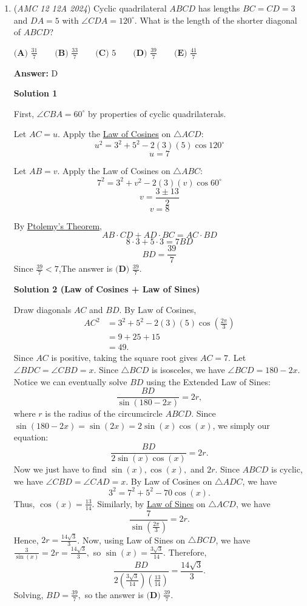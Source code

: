\begin{enumerate}
 


	\item (\textit{AMC 12 12A 2024}) Cyclic quadrilateral $ABCD$ has lengths $BC=CD=3$ and $DA=5$ with $\angle CDA=120^\circ$. What is the length of the shorter diagonal of $ABCD$?


 $\textbf{(A) }\frac{31}7 \qquad \textbf{(B) }\frac{33}7 \qquad \textbf{(C) }5 \qquad \textbf{(D) }\frac{39}7 \qquad \textbf{(E) }\frac{41}7 \qquad$

 \textbf{Answer: }D



\textbf{Solution 1}

First, $\angle CBA=60 ^\circ$ by properties of cyclic quadrilaterals.

 Let $AC=u$. Apply the \href{https://artofproblemsolving.com/wiki/index.php?title=Law\_of\_Cosines}{Law of Cosines} on $\triangle ACD$:
 \[u^2=3^2+5^2-2(3)(5)\cos120^\circ\]
 \[u=7\]

 Let $AB=v$. Apply the Law of Cosines on $\triangle ABC$:
 \[7^2=3^2+v^2-2(3)(v)\cos60^\circ\]
 \[v=\frac{3\pm13}{2}\]
 \[v=8\]

 By \href{https://artofproblemsolving.com/wiki/index.php?title=Ptolemy\%E2\%80\%99s\_Theorem}{Ptolemy’s Theorem},
 \[AB \cdot CD+AD \cdot BC=AC \cdot BD\]
 \[8 \cdot 3+5 \cdot 3=7BD\]
 \[BD=\frac{39}{7}\]Since $\frac{39}{7}<7$,The answer is $\boxed{\textbf{(D) }\frac{39}{7}}$.

 



\textbf{Solution 2 (Law of Cosines + Law of Sines)}

Draw diagonals $AC$ and $BD$. By Law of Cosines, \begin{align*}AC^2&=3^2 + 5^2 - 2(3)(5)\cos \left(\frac{2\pi}{3} \right) \\&= 9+25 +15 \\&=49.\end{align*}
Since $AC$ is positive, taking the square root gives $AC=7.$ Let $\angle BDC=\angle CBD=x$. Since $\triangle BCD$ is isosceles, we have $\angle BCD=180-2x$. Notice we can eventually solve $BD$ using the Extended Law of Sines: 
 \[\frac{BD}{\sin(180-2x)}=2r,\] where $r$ is the radius of the circumcircle $ABCD$. Since $\sin(180-2x)=\sin(2x)=2\sin(x)\cos(x)$, we simply our equation: 
 \[\frac{BD}{2\sin(x)\cos(x)}=2r.\]Now we just have to find $\sin(x), \cos(x),$ and $2r$. Since $ABCD$ is cyclic, we have $\angle CBD = \angle CAD = x$. By Law of Cosines on $\triangle ADC$, we have  
 \[3^2=7^2 + 5^2 - 70\cos(x).\] Thus, $\cos(x)=\frac{13}{14}.$ Similarly, by \href{https://artofproblemsolving.com/wiki/index.php?title=Law\_of\_Sines}{Law of Sines} on $\triangle ACD$, we have 
 \[\frac{7}{\sin\left(\frac{2\pi}{3} \right)}=2r.\] Hence, $2r=\frac{14\sqrt3}{3}$. Now, using Law of Sines on $\triangle BCD$, we have $\frac{3}{\sin(x)}=2r= \frac{14\sqrt3}{3},$ so $\sin(x)=\frac{3\sqrt3}{14}.$ Therefore, 
 \[\frac{BD}{2\left(\frac{3\sqrt3}{14}\right) \left(\frac{13}{14} \right)}=\frac{14\sqrt3}{3}.\] Solving, $BD = \frac{39}{7},$ so the answer is $\boxed{\textbf{(D) }\frac{39}{7}}$. 


\end{enumerate}
